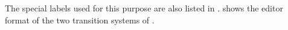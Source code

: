 The special labels used for this purpose are also listed in
.  shows the editor format of the two
transition systems of .



